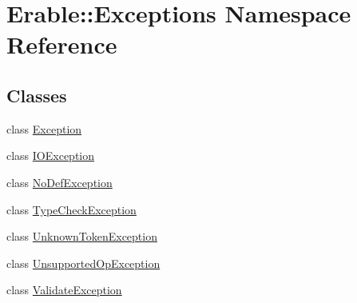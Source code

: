 \hypertarget{namespace_erable_1_1_exceptions}{}\section{Erable\+::Exceptions Namespace Reference}
\label{namespace_erable_1_1_exceptions}
\subsection*{Classes}
\begin{DoxyCompactItemize}
\item 
class \mbox{\hyperlink{class_erable_1_1_exceptions_1_1_exception}{Exception}}
\item 
class \mbox{\hyperlink{class_erable_1_1_exceptions_1_1_i_o_exception}{I\+O\+Exception}}
\item 
class \mbox{\hyperlink{class_erable_1_1_exceptions_1_1_no_def_exception}{No\+Def\+Exception}}
\item 
class \mbox{\hyperlink{class_erable_1_1_exceptions_1_1_type_check_exception}{Type\+Check\+Exception}}
\item 
class \mbox{\hyperlink{class_erable_1_1_exceptions_1_1_unknown_token_exception}{Unknown\+Token\+Exception}}
\item 
class \mbox{\hyperlink{class_erable_1_1_exceptions_1_1_unsupported_op_exception}{Unsupported\+Op\+Exception}}
\item 
class \mbox{\hyperlink{class_erable_1_1_exceptions_1_1_validate_exception}{Validate\+Exception}}
\end{DoxyCompactItemize}
